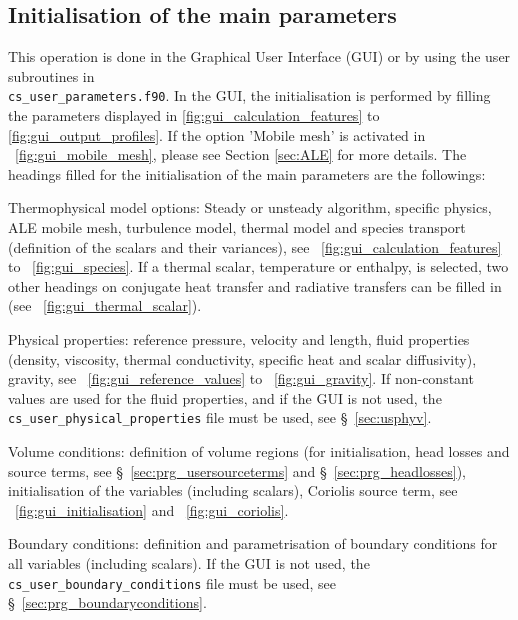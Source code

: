 {{%
\subsection{Initialisation of the main parameters}

This operation is done in the Graphical User Interface (GUI) or by using the user subroutines in \\ \texttt{cs\_user\_parameters.f90}.
In the GUI, the initialisation is performed by filling the parameters displayed in \figurename\ref{fig:gui_calculation_features}
to \ref{fig:gui_output_profiles}. If the option 'Mobile mesh' is activated in \figurename~\ref{fig:gui_mobile_mesh},
please see Section \ref{sec:ALE} for more details. The headings filled for the initialisation of the main parameters
are the followings:
\begin{list}{-}{}
\item Thermophysical model options: Steady or unsteady algorithm, specific physics, ALE mobile mesh,
      turbulence model, thermal model and species transport (definition of the scalars and their variances),
see \figurename~\ref{fig:gui_calculation_features} to \figurename~\ref{fig:gui_species}. If a thermal scalar, temperature or enthalpy, is selected,
two other headings on conjugate heat transfer and radiative transfers can be filled in (see \figurename~\ref{fig:gui_thermal_scalar}).
\item Physical properties: reference pressure, velocity and length, fluid properties (density, viscosity, thermal conductivity,
specific heat and scalar diffusivity), gravity, see \figurename~\ref{fig:gui_reference_values} to \figurename~\ref{fig:gui_gravity}.
If non-constant values are used for the fluid properties, and if the GUI is not used, the \\ \texttt{cs\_user\_physical\_properties}
file must be used, see \S~\ref{sec:usphyv}.
\item Volume conditions: definition of volume regions (for initialisation, head losses and source terms,
see \S~\ref{sec:prg_usersourceterms} and \S~\ref{sec:prg_headlosses}), initialisation of the variables (including scalars),
Coriolis source term, see \figurename~\ref{fig:gui_initialisation} and \figurename~\ref{fig:gui_coriolis}.
\item Boundary conditions: definition and parametrisation of boundary conditions for all variables (including scalars).
If the GUI is not used, the \texttt{cs\_user\_boundary\_conditions} file must be used, see \S~\ref{sec:prg_boundaryconditions}.

\end{list}}}
